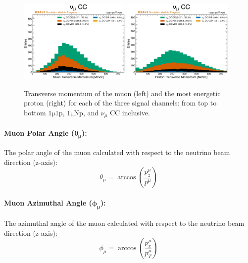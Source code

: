 \begin{figure}[!htb]
    \\
    \includegraphics[width=0.48\textwidth]{figures/neutrino_selection/signal_hist1d_1muX_muon_pt.pdf}
    \includegraphics[width=0.48\textwidth]{figures/neutrino_selection/signal_hist1d_1muX_proton_pt.pdf}
    \caption{Transverse momentum of the muon (left) and the most energetic proton (right) for each of the three signal channels: from top to bottom $\mathrm{1\mu 1p}$, $\mathrm{1\mu Np}$, and $\nu_\mu$ CC inclusive.}
    \label{fig:muon_proton_pt}
\end{figure}

\paragraph{Muon Polar Angle ($\mathbf{\theta_\mu}$):}
The polar angle of the muon calculated with respect to the neutrino beam direction (z-axis):
\begin{equation}
    \theta_\mu = \arccos\left(\frac{p^\mu_z}{p^\mu}\right)
\end{equation}

\paragraph{Muon Azimuthal Angle ($\mathbf{\phi_\mu}$):}
The azimuthal angle of the muon calculated with respect to the neutrino beam direction (z-axis):
\begin{equation}
    \phi_\mu = \arccos\left(\frac{p^\mu_x}{p^\mu_T}\right)
\end{equation}


